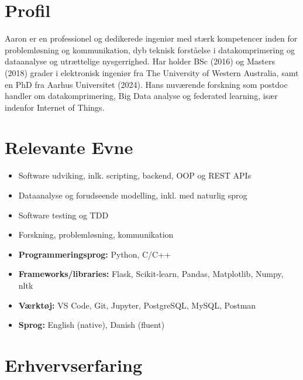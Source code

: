\documentclass[a4paper,11pt]{article}
\begin{document}






\section{Profil}\vspace{-0.3em}

Aaron er en professionel og dedikerede ingeniør med stærk kompetencer inden for problemløsning og kommunikation, dyb teknisk forståelse i datakomprimering og dataanalyse og utrættelige nysgerrighed.
Har holder BSc (2016) og Masters (2018) grader i elektronisk ingeniør fra The University of Western Australia, samt en PhD fra Aarhus Universitet (2024).
Hans nuværende forskning som postdoc handler om datakomprimering, Big Data analyse og federated learning, især indenfor Internet of Things.




\section{Relevante Evne}\vspace{-1.3em}

\begin{multicols}{2}
    \begin{itemize}[topsep=0pt,itemsep=-0.3em]
        \item Software udviking, inlk. scripting, backend, OOP og REST APIs
        \item Dataanalyse og forudseende modelling, inkl. med naturlig sprog
        \item Software testing og TDD
        \item Forskning, problemløsning, kommunikation

        \item \textbf{Programmeringsprog:} Python, C/C++
        \item \textbf{Frameworks/libraries:} Flask, Scikit-learn, Pandas, Matplotlib, Numpy, nltk
        \item \textbf{Værktøj:} VS Code, Git, Jupyter, PostgreSQL, MySQL, Postman
        \item \textbf{Sprog:} English (native), Danish (fluent)
    \end{itemize}
\end{multicols}
\vspace{-0.7em}




\section{Erhvervserfaring}
\end{document}
